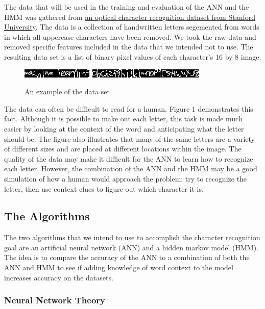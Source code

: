 \documentclass[11pt,a4paper,twocolumn]{article}
\begin{document}
The data that will be used in the training and evaluation of the ANN and the HMM was gathered from
\href{http://ai.stanford.edu/~btaskar/ocr/}{an optical character recognition dataset from Stanford University}. The data is a collection of handwritten letters segemented from words in which all uppercase characters have been removed. We took the raw data and removed specific features included in the data that we intended not to use. The resulting data set is a list of binary pixel values of each character's 16 by 8 image.
\begin{figure}[h]
\centering
\includegraphics{img/ml.jpg}
\includegraphics{img/alphabet.jpg}
\caption{An example of the data set}
\end{figure}

The data can often be difficult to read for a human. Figure 1 demonstrates this fact. Although it is possible to make out each letter, this task is made much easier by looking at the context of the word and anticipating what the letter should be. The figure also illustrates that many of the same letters are a variety of different sizes and are placed at different locations within the image. The quality of the data may make it difficult for the ANN to learn how to recognize each letter. However, the combination of the ANN and the HMM may be a good simulation of how a human would approach the problem: try to recognize the letter, then use context clues to figure out which character it is.

\subsection*{The Algorithms}

The two algorithms that we intend to use to accomplish the character recognition goal are an artificial neural network (ANN) and a hidden markov model (HMM). The idea is to compare the accuracy of the ANN to a combination of both the ANN and HMM to see if adding knowledge of word context to the model increases accuracy on the datasets.

\subsubsection*{Neural Network Theory}
\end{document}
